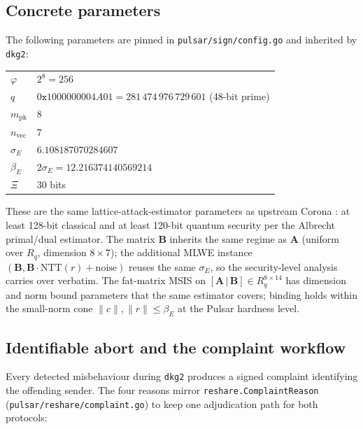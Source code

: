 \subsection{Concrete parameters}
\label{ssec:pedersen-params}

The following parameters are pinned in \texttt{pulsar/sign/config.go}
and inherited by \texttt{dkg2}:

\begin{tabular}{ll}
\toprule
$\varphi$           & $2^8 = 256$ \\
$q$                 & $0\mathtt{x}1000000004A01 = 281\,474\,976\,729\,601$ (48-bit prime) \\
$m_{\textrm{pk}}$   & $8$ \\
$n_{\textrm{vec}}$  & $7$ \\
$\sigma_E$          & $6.108187070284607$ \\
$\beta_E$           & $2\sigma_E = 12.216374140569214$ \\
$\Xi$               & $30$ bits \\
\bottomrule
\end{tabular}

These are the same lattice-attack-estimator parameters as upstream
Corona \cite{boschini2024corona}: at least 128-bit classical and at least
120-bit quantum security per the Albrecht primal/dual estimator. The
matrix $\mathbf{B}$ inherits the same regime as $\mathbf{A}$
(uniform over $R_q$, dimension $8\times 7$); the additional MLWE
instance $(\mathbf{B}, \mathbf{B}\cdot\mathrm{NTT}(r) + \mathrm{noise})$
reuses the same $\sigma_E$, so the security-level analysis carries
over verbatim. The fat-matrix MSIS on
$[\mathbf{A}\,|\,\mathbf{B}]\in R_q^{8\times 14}$ has dimension and
norm bound parameters that the same estimator covers; binding holds
within the small-norm cone $\|c\|,\|r\|\le\beta_E$ at the Pulsar
hardness level.

\subsection{Identifiable abort and the complaint workflow}
\label{ssec:pedersen-complaint}

Every detected misbehaviour during \texttt{dkg2} produces a signed
complaint identifying the offending sender. The four reasons mirror
\texttt{reshare.ComplaintReason} (\texttt{pulsar/reshare/complaint.go})
to keep one adjudication path for both protocols:

